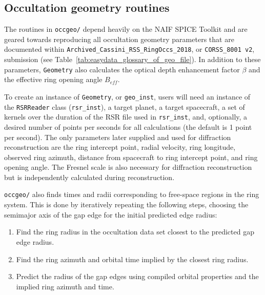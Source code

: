 \documentclass[titlepage, 12pt]{article}
\begin{document}
        \subsection{Occultation geometry routines}
        The routines in \texttt{occgeo/} depend heavily on the
            NAIF SPICE Toolkit and are geared towards reproducing
            all occultation geometry parameters that are documented within
            \texttt{Archived\_Cassini\_RSS\_RingOccs\_2018},
            or \texttt{CORSS\_8001 v2}, submission
            (see Table~\ref{tab:easydata_glossary_of_geo_file}).
            In addition to these parameters, \texttt{Geometry}
            also calculates %
            the optical depth enhancement
            factor $\beta$ and the effective ring opening angle $B_{eff}$.
            \par\hfill\par
                    To create an instance of \texttt{Geometry}, or
            \texttt{geo\_inst}, users will need an instance of
            the \texttt{RSRReader} class (\texttt{rsr\_inst}),
            a target planet, a target spacecraft, a set of kernels
            over the duration of the RSR file used in
            \texttt{rsr\_inst}, and, optionally, a desired number
            of points per seconds for all calculations
            (the default is 1 point per second). The only parameters later supplied and used for diffraction reconstruction are the ring intercept point, radial velocity, ring longitude, observed ring azimuth, distance from spacecraft to ring intercept point, and ring opening angle. The Fresnel scale is also necessary for diffraction reconstruction but is independently calculated during reconstruction.
            \par\hfill\par
            \texttt{occgeo/} also finds times and radii corresponding to free-space regions in the ring system. This is done by iteratively repeating the following steps, choosing the semimajor axis of the gap edge for the initial predicted edge radius:             \begin{enumerate}
                \item Find the ring radius in the occultation data set closest to the predicted gap edge radius.
                \item Find the ring azimuth and orbital time implied by the closest ring radius.
                \item Predict the radius of the gap edges using compiled orbital properties and the implied ring azimuth and time.
            \end{enumerate}
\end{document}
